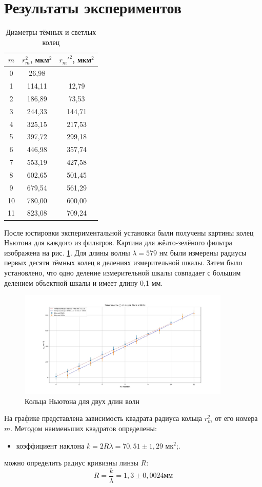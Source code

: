 \documentclass[a4paper,12pt]{article} %
\begin{document}
\section{Результаты экспериментов}
\begin{table}[H]
    \centering
    \begin{tabular}{|c|c|c|}
        \hline $m$ & $r_{m}^{2}$, мкм$^2$ & $r_{m}'^{2}$, мкм$^2$\\ \hline
        0 & 26,98 &  \\ \hline
        1 & 114,11 & 12,79 \\ \hline
        2 & 186,89 & 73,53 \\ \hline
        3 & 244,33 & 144,71 \\ \hline
        4 & 325,15 & 217,53 \\ \hline
        5 & 397,72 & 299,18 \\ \hline
        6 & 446,98 & 357,74 \\ \hline
        7 & 553,19 & 427,58 \\ \hline
        8 & 602,65 & 501,45 \\ \hline
        9 & 679,54 & 561,29 \\ \hline
        10 & 780,00 & 600,00 \\ \hline
        11 & 823,08 & 709,24 \\ \hline
    \end{tabular}
    \caption{Диаметры тёмных и светлых колец}
    \label{radi}
\end{table}
После юстировки экспериментальной установки были получены картины колец Ньютона
для каждого из фильтров. Картина для жёлто-зелёного фильтра изображена на рис. \ref{ringImage}. Для длины волны $\lambda = 579$ нм были измерены радиусы первых десяти тёмных колец в делениях измерительной шкалы. Затем было установлено, что одно деление измерительной шкалы совпадает с большим делением объектной шкалы и имеет длину 0,1 мм. 
\begin{figure}[h]
   \centering
   \includegraphics[width=0.9\textwidth]{график2.jpg}
   \caption{Кольца Ньютона для двух длин волн}
   \label{ringImage}
\end{figure}
На графике представлена зависимость квадрата радиуса кольца $r_m^2$ от его номера $m$. Методом наименьших квадратов определены:
\begin{itemize}
    \item коэффициент наклона $k = 2R\lambda = 70,51 \pm 1,29$ мк$^2$;.
\end{itemize}
можно определить радиус кривизны линзы $R$:
$$
R = \frac{k}{\lambda} = 1,3 \pm 0,0024 \text{мм}
$$
\end{document}
